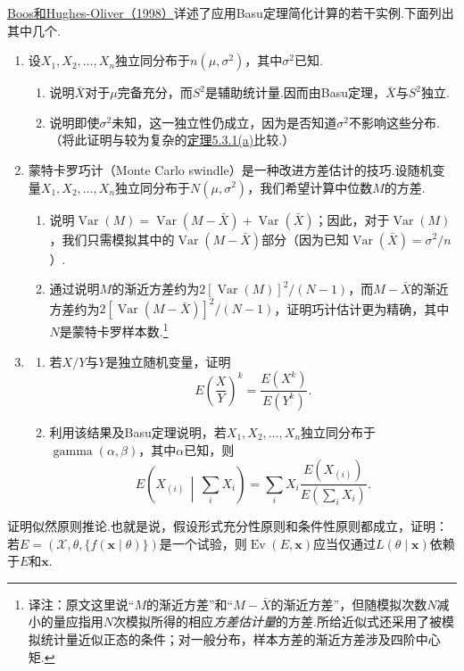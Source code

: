\begin{exercise}\label{exercise:6.31}
\hyperref[bib:source42]{Boos和Hughes-Oliver（1998）}详述了应用Basu定理简化计算的若干实例.下面列出其中几个.
\begin{enumerate}[label=(\alph*)]
\item 设$X_1,X_2,\ldots,X_n$独立同分布于$n(\mu,\sigma^2)$，其中$\sigma^2$已知.
\begin{enumerate}[label=(\roman*)]
\item 说明$\bar X$对于$\mu$完备充分，而$S^2$是辅助统计量.因而由Basu定理，$\bar X$与$S^2$独立.
\item 说明即使$\sigma^2$未知，这一独立性仍成立，因为是否知道$\sigma^2$不影响这些分布.（将此证明与较为复杂的\hyperref[thm:5.3.1]{定理5.3.1(a)}比较.）
\end{enumerate}
\item 蒙特卡罗巧计（Monte Carlo swindle）是一种改进方差估计的技巧.设随机变量$X_1,X_2,\ldots,X_n$独立同分布于$N(\mu,\sigma^2)$，我们希望计算中位数$M$的方差.
\begin{enumerate}[label=(\roman*)]
\item 说明$\operatorname{Var}(M)=\operatorname{Var}(M-\bar X)+\operatorname{Var}(\bar X)$；因此，对于$\operatorname{Var}(M)$，我们只需模拟其中的$\operatorname{Var}(M-\bar X)$部分（因为已知$\operatorname{Var}(\bar X)=\sigma^2/n$）.
\item 通过说明$M$的渐近方差约为$2[\operatorname{Var}(M)]^2/(N-1)$，而$M-\bar X$的渐近方差约为$2[\operatorname{Var}(M-\bar X)]^2/(N-1)$，证明巧计估计更为精确，其中$N$是蒙特卡罗样本数.\footnote{译注：原文这里说“$M$的渐近方差”和“$M-\bar X$的渐近方差”，但随模拟次数$N$减小的量应指用$N$次模拟所得的相应\emph{方差估计量}的方差.所给近似式还采用了被模拟统计量近似正态的条件；对一般分布，样本方差的渐近方差涉及四阶中心矩.}
\end{enumerate}
\item \begin{enumerate}[label=(\roman*)]
\item 若$X/Y$与$Y$是独立随机变量，证明
$$E\left(\frac XY\right)^k=\frac{E(X^k)}{E(Y^k)}.$$
\item 利用该结果及Basu定理说明，若$X_1,X_2,\ldots,X_n$独立同分布于$\operatorname{gamma}(\alpha,\beta)$，其中$\alpha$已知，则
$$E\left(X_{(i)}\,\middle|\,\sum_iX_i\right)=\sum_iX_i\frac{E(X_{(i)})}{E(\sum_iX_i)}.$$
\end{enumerate}
\end{enumerate}
\end{exercise}
\begin{exercise}\label{exercise:6.32}
证明似然原则推论.也就是说，假设形式充分性原则和条件性原则都成立，证明：若$E=(\mathcal X,\theta,\{f(\boldsymbol x\mid\theta)\})$是一个试验，则$\operatorname{Ev}(E,\boldsymbol x)$应当仅通过$L(\theta\mid\boldsymbol x)$依赖于$E$和$\boldsymbol x$.
\end{exercise}
